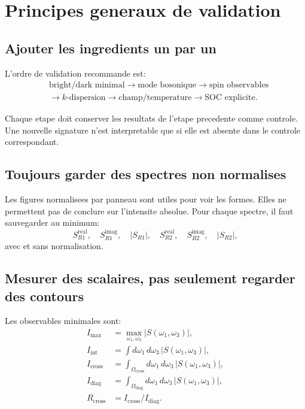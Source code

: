 \documentclass[11pt]{article}
\begin{document}
\section{Principes generaux de validation}

\subsection{Ajouter les ingredients un par un}

L'ordre de validation recommande est:
\begin{equation}
\begin{aligned}
&\text{bright/dark minimal}
\rightarrow
\text{mode bosonique}
\rightarrow
\text{spin observables}
\\
&\rightarrow
k\text{-dispersion}
\rightarrow
\text{champ/temperature}
\rightarrow
\text{SOC explicite}.
\end{aligned}
\end{equation}

Chaque etape doit conserver les resultats de l'etape precedente comme controle. Une nouvelle signature n'est interpretable que si elle est absente dans le controle correspondant.

\subsection{Toujours garder des spectres non normalises}

Les figures normalisees par panneau sont utiles pour voir les formes. Elles ne permettent pas de conclure sur l'intensite absolue. Pour chaque spectre, il faut sauvegarder au minimum:
\begin{equation}
S_{R1}^{\mathrm{real}},\quad
S_{R1}^{\mathrm{imag}},\quad
|S_{R1}|,\quad
S_{R2}^{\mathrm{real}},\quad
S_{R2}^{\mathrm{imag}},\quad
|S_{R2}|,
\end{equation}
avec et sans normalisation.

\subsection{Mesurer des scalaires, pas seulement regarder des contours}

Les observables minimales sont:
\begin{align}
I_{\max} &= \max_{\omega_1,\omega_3}|S(\omega_1,\omega_3)|,\\
I_{\mathrm{int}} &= \int d\omega_1\,d\omega_3\,|S(\omega_1,\omega_3)|,\\
I_{\mathrm{cross}} &= \int_{\Omega_{\mathrm{cross}}} d\omega_1\,d\omega_3\,|S(\omega_1,\omega_3)|,\\
I_{\mathrm{diag}} &= \int_{\Omega_{\mathrm{diag}}} d\omega_1\,d\omega_3\,|S(\omega_1,\omega_3)|,\\
R_{\mathrm{cross}} &= I_{\mathrm{cross}}/I_{\mathrm{diag}}.
\end{align}
\end{document}
